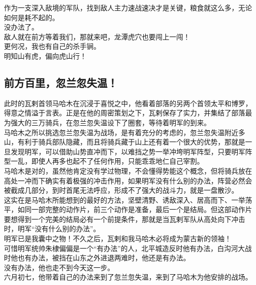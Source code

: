 \begin{multicols}{\theparacolNo}
作为一支深入敌境的军队，找到敌人主力速战速决才是关键，粮食就这么多，无论如何是耗不起的。\\

没办法了。\\

敌人就在前方等着我们，那就来吧，龙潭虎穴也要闯上一闯！\\

更何况，我也有自己的杀手锏。\\

明知山有虎，偏向虎山行！\\

\subsection{前方百里，忽兰忽失温！}
此时的瓦剌首领马哈木在沉浸于喜悦之中，他看着部落的另两个首领太平和博罗，得意之情溢于言表。正是在他的周密策划之下，瓦剌保存了实力，并集结了部落最为强大的三万骑兵，在忽兰忽失温设下了圈套，等待着明军的到来。\\

马哈木之所以挑选忽兰忽失温为战场，是有着充分的考虑的，忽兰忽失温附近多山，有利于骑兵部队隐藏，而且将骑兵藏于山上还有着一个很大的优势，那就是一旦发现明军，可以借助山势直冲而下，以难挡之势一举冲垮明军阵型，只要明军阵型一乱，即使人再多也起不了任何作用，只能乖乖地仁自己宰割。\\

马哈木是对的，虽然他肯定没有学过物理，不会懂得势能这个概念，但将骑兵放在高处一冲而下确实有着极强的冲击作用，如果明军没有什么别的办法，阵营必然会被截成几部分，到时首尾无法呼应，形成不了强大的战斗力，就是一盘散沙。\\

这实在是马哈木所能想到的最好的方法，坚壁清野、诱敌深入、居高而下、一举荡平，如同一部完整的动作片，前三个动作是准备，最后一个是结局。但这部动作片要想得到一个完美的结局必有一个前提条件，那就是当瓦剌军队从高处向下冲击时，明军“没有什么别的办法”。\\

明军已是我囊中之物！不久之后，瓦剌和我马哈木必将成为蒙古新的领袖！\\

可惜明军统帅朱棣偏偏是一个“有办法”的人，北平城造反时他有办法，白沟河大战时他也有办法，被挡在山东之外进退两难时，他还是有办法。\\

没有办法，他也走不到今天这一步。\\

六月初七，他带着自己的办法来到了忽兰忽失温，来到了马哈木为他安排的战场。\\


\end{multicols}
